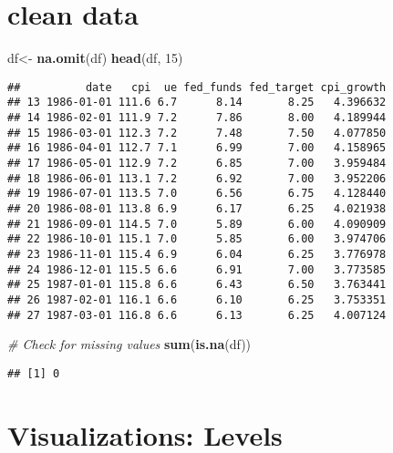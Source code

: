 \documentclass[
]{article}
\newenvironment{Shaded}{\begin{snugshade}}{\end{snugshade}}
\newcommand{\CommentTok}[1]{\textcolor[rgb]{0.56,0.35,0.01}{\textit{#1}}}
\newcommand{\DecValTok}[1]{\textcolor[rgb]{0.00,0.00,0.81}{#1}}
\newcommand{\FunctionTok}[1]{\textcolor[rgb]{0.13,0.29,0.53}{\textbf{#1}}}
\newcommand{\NormalTok}[1]{#1}
\newcommand{\OtherTok}[1]{\textcolor[rgb]{0.56,0.35,0.01}{#1}}
\begin{document}
\section{clean data}\label{clean-data}

\begin{Shaded}
\begin{Highlighting}[]
\NormalTok{df}\OtherTok{\textless{}{-}} \FunctionTok{na.omit}\NormalTok{(df)}
\FunctionTok{head}\NormalTok{(df, }\DecValTok{15}\NormalTok{)}
\end{Highlighting}
\end{Shaded}

\begin{verbatim}
##          date   cpi  ue fed_funds fed_target cpi_growth
## 13 1986-01-01 111.6 6.7      8.14       8.25   4.396632
## 14 1986-02-01 111.9 7.2      7.86       8.00   4.189944
## 15 1986-03-01 112.3 7.2      7.48       7.50   4.077850
## 16 1986-04-01 112.7 7.1      6.99       7.00   4.158965
## 17 1986-05-01 112.9 7.2      6.85       7.00   3.959484
## 18 1986-06-01 113.1 7.2      6.92       7.00   3.952206
## 19 1986-07-01 113.5 7.0      6.56       6.75   4.128440
## 20 1986-08-01 113.8 6.9      6.17       6.25   4.021938
## 21 1986-09-01 114.5 7.0      5.89       6.00   4.090909
## 22 1986-10-01 115.1 7.0      5.85       6.00   3.974706
## 23 1986-11-01 115.4 6.9      6.04       6.25   3.776978
## 24 1986-12-01 115.5 6.6      6.91       7.00   3.773585
## 25 1987-01-01 115.8 6.6      6.43       6.50   3.763441
## 26 1987-02-01 116.1 6.6      6.10       6.25   3.753351
## 27 1987-03-01 116.8 6.6      6.13       6.25   4.007124
\end{verbatim}

\begin{Shaded}
\begin{Highlighting}[]
\CommentTok{\# Check for missing values}
\FunctionTok{sum}\NormalTok{(}\FunctionTok{is.na}\NormalTok{(df))}
\end{Highlighting}
\end{Shaded}

\begin{verbatim}
## [1] 0
\end{verbatim}

\section{Visualizations: Levels}\label{visualizations-levels}
\end{document}
